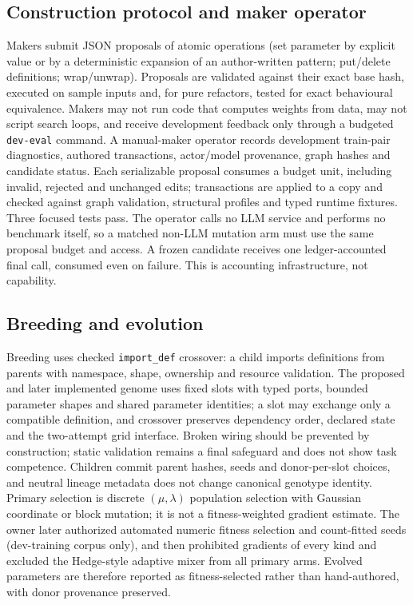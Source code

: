 \documentclass[11pt]{article}
\begin{document}
\subsection{Construction protocol and maker operator}
Makers submit JSON proposals of atomic operations (set parameter by explicit value or by a
deterministic expansion of an author-written pattern; put/delete definitions; wrap/unwrap).
Proposals are validated against their exact base hash, executed on sample inputs and, for pure
refactors, tested for exact behavioural equivalence. Makers may not run code that computes
weights from data, may not script search loops, and receive development feedback only through a
budgeted \texttt{dev-eval} command. A manual-maker operator records development train-pair
diagnostics, authored transactions, actor/model provenance, graph hashes and candidate status.
Each serializable proposal consumes a budget unit, including invalid, rejected and unchanged
edits; transactions are applied to a copy and checked against graph validation, structural
profiles and typed runtime fixtures. Three focused tests pass. The operator calls no LLM
service and performs no benchmark itself, so a matched non-LLM mutation arm must use the same
proposal budget and access. A frozen candidate receives one ledger-accounted final call,
consumed even on failure. This is accounting infrastructure, not capability.

\subsection{Breeding and evolution}
Breeding uses checked \texttt{import\_def} crossover: a child imports definitions from
parents with namespace, shape, ownership and resource validation. The proposed and later
implemented genome uses fixed slots with typed ports, bounded parameter shapes and shared
parameter identities; a slot may exchange only a compatible definition, and crossover preserves
dependency order, declared state and the two-attempt grid interface. Broken wiring should be
prevented by construction; static validation remains a final safeguard and does not show task
competence. Children commit parent hashes, seeds and donor-per-slot choices, and neutral lineage
metadata does not change canonical genotype identity. Primary selection is discrete $(\mu,\lambda)$
population selection with Gaussian coordinate or block mutation; it is not a fitness-weighted
gradient estimate. The owner later authorized automated numeric fitness selection and count-fitted
seeds (dev-training corpus only), and then prohibited gradients of every kind and excluded the
Hedge-style adaptive mixer from all primary arms. Evolved parameters are therefore reported as
fitness-selected rather than hand-authored, with donor provenance preserved.
\end{document}
